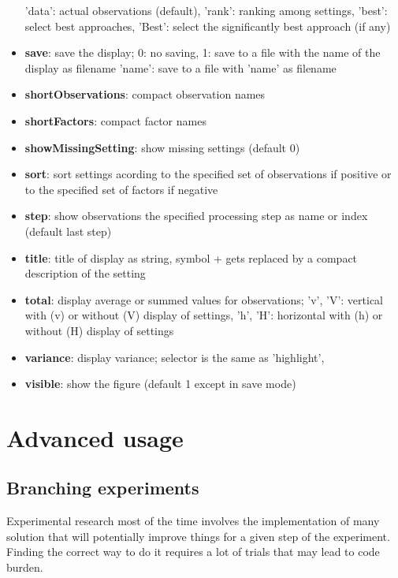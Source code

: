 \documentclass[a4paper,fleqn]{tufte-handout}
\begin{document}
\begin{itemize}
        'data': actual observations (default),
        'rank': ranking among settings,
        'best': select best approaches,
        'Best': select the significantly best approach (if any)                 
\item \textbf{save}: save the display;
    	0: no saving,
    	1: save to a file with the name of the display as filename
    	'name': save to a file with 'name' as filename
\item \textbf{shortObservations}: compact observation names                 
\item \textbf{shortFactors}: compact factor names  
\item \textbf{showMissingSetting}:  show missing settings (default 0)                
\item \textbf{sort}:   sort settings acording to the specified set of observations if
        positive or to the specified set of factors if negative
\item \textbf{step}: show observations the specified processing step as name or
    index (default last step)                 
\item \textbf{title}: title of display as string,
    	symbol + gets replaced by a compact description of the setting  
\item \textbf{total}:  display average  or summed values for observations;
        'v', 'V': vertical with (v) or without (V) display of settings,
        'h', 'H': horizontal with (h) or without (H) display of settings                
\item \textbf{variance}:   display variance;
    	selector is the same as 'highlight',
\item \textbf{visible}: show the figure (default 1 except in save mode)                    
\end{itemize}

\section{Advanced usage}

\subsection{Branching experiments}

Experimental research most of the time involves the implementation of many solution that will potentially improve things for a given step of the experiment. Finding the correct way to do it requires a lot of trials that may lead to code burden.
\end{document}
